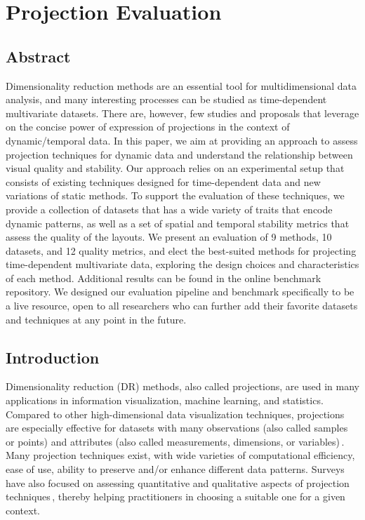
\chapter{Projection Evaluation}


\section{Abstract}
Dimensionality reduction methods are an essential tool for multidimensional data analysis, and many interesting processes can be studied as time-dependent multivariate datasets. There are, however, few studies and proposals that leverage on the concise power of expression of projections in the context of dynamic/temporal data.  In this paper, we aim at providing an approach to assess projection techniques for dynamic data and understand the relationship between visual quality and stability. Our approach relies on an experimental setup that consists of existing techniques designed for time-dependent data and new variations of static methods. To support the evaluation of these techniques, we provide a collection of datasets that has a wide variety of traits that encode dynamic patterns, as well as a set of spatial and temporal stability metrics that assess the quality of the layouts.  We present an evaluation of 9 methods, 10 datasets, and 12 quality metrics, and elect the best-suited methods for projecting time-dependent multivariate data, exploring the design choices and characteristics of each method. Additional results can be found in the online benchmark repository. We designed our evaluation pipeline and benchmark specifically to be a live resource, open to all researchers who can further add their favorite datasets and techniques at any point in the future.

\section{Introduction}
%
Dimensionality reduction (DR) methods, also called projections, are used in many applications in information visualization, machine learning, and statistics. Compared to other high-dimensional data visualization techniques, projections are especially effective for datasets with many observations (also called samples or points) and attributes (also called measurements, dimensions, or variables)\,\cite{Liu2017}. Many projection techniques exist, with wide varieties of computational efficiency, ease of use, ability to preserve and/or enhance different data patterns. Surveys have also focused on assessing quantitative and qualitative aspects of projection techniques\,\cite{nonato_survey,vandermaaten2009dimensionality,EspadotoSurvey}, thereby helping practitioners in choosing a suitable one for a given context.

